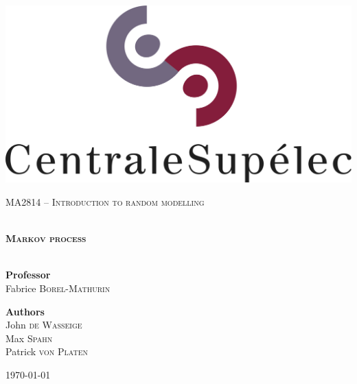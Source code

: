 \begin{titlepage}
\begin{center}

\includegraphics[scale=0.5]{./img/logo_centralesup.jpg} \hfill

\vfill 

\textsc{\Large MA2814 -- Introduction to random modelling}\\[0.5cm]

\vfill

\HRule \\[0.4cm]
{ \LARGE \bfseries \textsc{Markov process}\\[0.4cm] }
\HRule \\[1.5cm]


\vfill

{\large
\begin{center}
  \textbf{Professor}\\[0.1cm]
  Fabrice \textsc{Borel-Mathurin}
\end{center}
\vfill
\begin{center}
  \textbf{Authors}\\[0.1cm]
  John \textsc{de Wasseige}\\[0.1cm]
  Max \textsc{Spahn}\\[0.1cm]
  Patrick \textsc{von Platen}
\end{center}
}

\vfill

{\large \today}

\end{center}
\end{titlepage}